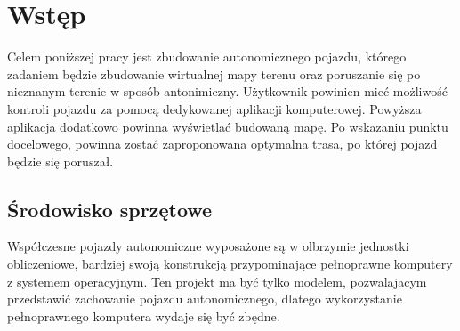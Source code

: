 \section{Wstęp}
    Celem poniższej pracy jest zbudowanie autonomicznego pojazdu,
    którego zadaniem będzie zbudowanie wirtualnej mapy terenu oraz poruszanie się po nieznanym terenie w sposób antonimiczny.
    Użytkownik powinien mieć możliwość kontroli pojazdu za pomocą dedykowanej aplikacji komputerowej.
    Powyższa aplikacja dodatkowo powinna wyświetlać budowaną mapę.
    Po wskazaniu punktu docelowego, powinna zostać zaproponowana optymalna trasa, po której pojazd będzie się poruszał.


    \subsection{Środowisko sprzętowe}
        Współczesne pojazdy autonomiczne wyposażone są w olbrzymie jednostki obliczeniowe, bardziej swoją konstrukcją przypominające pełnoprawne komputery z systemem operacyjnym.
        Ten projekt ma być tylko modelem, pozwalajacym przedstawić zachowanie pojazdu autonomicznego, dlatego wykorzystanie pełnoprawnego komputera wydaje się być zbędne.

